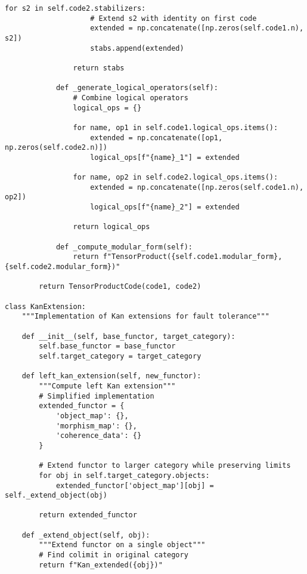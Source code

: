\documentclass[12pt,a4paper]{article}
\begin{document}
\begin{lstlisting}[style=python,caption=Advanced categorical structures for QEC]
                for s2 in self.code2.stabilizers:
                    # Extend s2 with identity on first code  
                    extended = np.concatenate([np.zeros(self.code1.n), s2])
                    stabs.append(extended)
                    
                return stabs
                
            def _generate_logical_operators(self):
                # Combine logical operators
                logical_ops = {}
                
                for name, op1 in self.code1.logical_ops.items():
                    extended = np.concatenate([op1, np.zeros(self.code2.n)])
                    logical_ops[f"{name}_1"] = extended
                    
                for name, op2 in self.code2.logical_ops.items():
                    extended = np.concatenate([np.zeros(self.code1.n), op2])
                    logical_ops[f"{name}_2"] = extended
                    
                return logical_ops
                
            def _compute_modular_form(self):
                return f"TensorProduct({self.code1.modular_form}, {self.code2.modular_form})"
        
        return TensorProductCode(code1, code2)

class KanExtension:
    """Implementation of Kan extensions for fault tolerance"""
    
    def __init__(self, base_functor, target_category):
        self.base_functor = base_functor
        self.target_category = target_category
        
    def left_kan_extension(self, new_functor):
        """Compute left Kan extension"""
        # Simplified implementation
        extended_functor = {
            'object_map': {},
            'morphism_map': {},
            'coherence_data': {}
        }
        
        # Extend functor to larger category while preserving limits
        for obj in self.target_category.objects:
            extended_functor['object_map'][obj] = self._extend_object(obj)
            
        return extended_functor
        
    def _extend_object(self, obj):
        """Extend functor on a single object"""
        # Find colimit in original category
        return f"Kan_extended({obj})"
        

\end{lstlisting}
\end{document}
